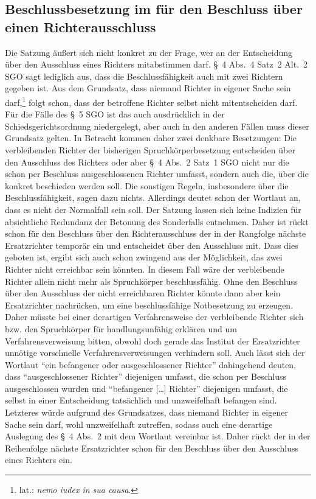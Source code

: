 \subsection{Beschlussbesetzung im für den Beschluss über einen Richterausschluss}
\label{Zusammensetzung:Spruchkoerper:Besetzungausschlussbeschluss}
Die Satzung äußert sich nicht konkret zu der Frage, wer an der Entscheidung über den Ausschluss eines Richters mitabstimmen darf.
\S~4 Abs.~4 Satz~2 Alt.~2 SGO sagt lediglich aus, dass die Beschlussfähigkeit auch mit zwei Richtern gegeben ist.
Aus dem Grundsatz, dass niemand Richter in eigener Sache sein darf,\footnote{lat.: \emph{nemo iudex in sua causa}.} folgt schon, dass der betroffene Richter selbst nicht mitentscheiden darf. Für die Fälle des \S~5 SGO ist das auch ausdrücklich in der Schiedsgerichtsordnung niedergelegt, aber auch in den anderen Fällen muss dieser Grundsatz gelten.
In Betracht kommen daher zwei denkbare Besetzungen: Die verbleibenden Richter der bisherigen Spruchkörperbesetzung entscheiden über den Ausschluss des Richters oder aber \S~4 Abs.~2 Satz~1 SGO nicht nur die schon per Beschluss ausgeschlossenen Richter umfasst, sondern auch die, über die konkret beschieden werden soll.
Die sonstigen Regeln, insbesondere über die Beschlussfähigkeit, sagen dazu nichts.
Allerdings deutet schon der Wortlaut  an, dass es nicht der Normalfall sein soll.
Der Satzung lassen sich keine Indizien für absichtliche Redundanz der Betonung des Sonderfalls entnehmen.
Daher ist rückt schon für den Beschluss über den Richterausschluss der in der Rangfolge nächste Ersatzrichter temporär ein und entscheidet über den Ausschluss mit.
Dass dies geboten ist, ergibt sich auch schon zwingend aus der Möglichkeit, das zwei Richter nicht erreichbar sein könnten.
In diesem Fall wäre der verbleibende Richter allein nicht mehr als Spruchkörper beschlussfähig.
Ohne den Beschluss über den Ausschluss der nicht erreichbaren Richter könnte dann aber kein Ersatzrichter nachrücken, um eine beschlussfähige Notbesetzung zu erzeugen.
Daher müsste bei einer derartigen Verfahrensweise der verbleibende Richter sich bzw. den Spruchkörper für handlungsunfähig erklären und um Verfahrensverweisung bitten, obwohl doch gerade das Institut der Ersatzrichter unnötige vorschnelle Verfahrensverweisungen verhindern soll.
Auch lässt sich der Wortlaut \enquote{ein befangener oder ausgeschlossener Richter} dahingehend deuten, dass \enquote{ausgeschlossener Richter} diejenigen umfasst, die schon per Beschluss ausgeschlossen wurden und \enquote{befangener […] Richter} diejenigen umfasst, die selbst in einer Entscheidung tatsächlich und unzweifelhaft befangen sind.
Letzteres würde aufgrund des Grundsatzes, dass niemand Richter in eigener Sache sein darf, wohl unzweifelhaft zutreffen, sodass auch eine derartige Auslegung des \S~4 Abs.~2 mit dem Wortlaut vereinbar ist.
Daher rückt der in der Reihenfolge nächste Ersatzrichter schon für den Beschluss über den Ausschluss eines Richters ein.

